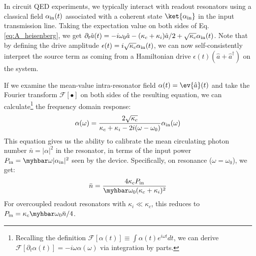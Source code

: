 \noindent In circuit QED experiments, we typically interact with readout resonators using a classical field $\alpha_{\rm in}(t)$ associated with a coherent state $\ket{\alpha_{\rm in}}$ in the input transmission line. Taking the expectation value on both sides of Eq. \eqref{eq:A_heisenberg}, we get $\partial_t \hat{a}(t) = -i\omega_0\hat{a} - (\kappa_c + \kappa_i)\hat{a}/2 + \sqrt{\kappa_c}\alpha_{\rm in}(t)$. Note that by defining the drive amplitude $\epsilon(t) = i\sqrt{\kappa_c}\alpha_{\rm in}(t)$, we can now self-consistently interpret the source term as coming from a Hamiltonian drive $\epsilon(t)(\hat{a} + \hat{a}^\dagger)$ on the system. 

If we examine the mean-value intra-resonator field $\alpha(t) = \ev{\hat{a}}(t)$ and take the Fourier transform $\mathcal{F}[\bullet]$ on both sides of the resulting equation, we can calculate\footnote{Recalling the definition $\mathcal{F}[\alpha(t)] \equiv \int \alpha(t) e^{i\omega t}dt$, we can derive $\mathcal{F}[\partial_t\alpha(t)] = -i\omega \alpha(\omega)$ via integration by parts.} the frequency domain response:
\begin{equation}
    \alpha(\omega) = \frac{2\sqrt{\kappa_c}}{\kappa_c + \kappa_i - 2i(\omega-\omega_0)} \alpha_{\rm in}(\omega)
    \label{eq:inputoutput-freq-domain}
\end{equation}
This equation gives us the ability to calibrate the mean circulating photon number $\bar{n} = |\alpha|^2$ in the resonator, in terms of the input power $P_{\rm in} = \myhbar\omega |\alpha_{\rm in}|^2$ seen by the device. Specifically, on resonance ($\omega = \omega_0$), we get:
\begin{equation}
    \bar{n} = \frac{4\kappa_c P_{\rm in}}{\myhbar\omega_0(\kappa_c + \kappa_i)^2}
\end{equation}
For overcoupled readout resonators with $\kappa_i \ll \kappa_c$, this reduces to $P_{\rm in} = \kappa_c\myhbar\omega_0 \bar{n}/4$. 


